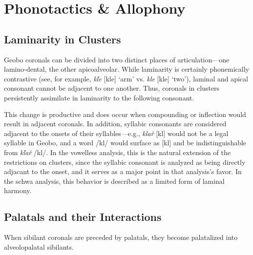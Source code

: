 \documentclass[a4paper,11pt,oneside,openany]{memoir}
\newcommand{\bripa}[1]{[#1]}
\newcommand{\phipa}[1]{/#1/}
\newcommand{\vr}{ř}
\newcommand{\vl}{ľ}
\begin{document}
\section{Phonotactics \& Allophony}\label{sec:allophony}

\subsection{Laminarity in Clusters}

Geobo\engma{} coronals can be divided into two distinct places of articulation---one lamino-dental, the other apicoalveolar. While laminarity is certainly phonemically contrastive (see, for example, \textit{k\vl e} \bripa{kl\apico e} `arm' vs. \textit{kle} \bripa{kl\lamino e} `two'), laminal and apical consonant cannot be adjacent to one another. Thus, coronals in clusters persistently assimilate in laminarity to the following consonant. 

This change is productive and does occur when compounding or inflection would result in adjacent coronals. In addition, syllabic consonants are considered adjacent to the onsets of their syllables---e.g., \textit{kla\vr} \bripa{kl\lamino\alvr\apico\sylb} would not be a legal syllable in Geobo\engma{}, and a word \phipa{kl\lamino\schwa\alvr\apico} would surface as \bripa{kl\apico\alvr\apico\sylb} and be indistinguishable from \textit{k\vl a\vr} \phipa{kl\apico\schwa\alvr\apico}. In the vowelless analysis, this is the natural extension of the restrictions on clusters, since the syllabic consonant is analyzed as being directly adjacant to the onset, and it serves as a major point in that analysis's favor. In the schwa analysis, this behavior is described as a limited form of laminal harmony. 

\setlength{\tabcolsep}{1pt}
\begin{center}
\end{center}

\subsection{Palatals and their Interactions}

When sibilant coronals are preceded by palatals, they become palatalized into alveolopalatal sibilants. 

\begin{center}
\end{center}
\end{document}
